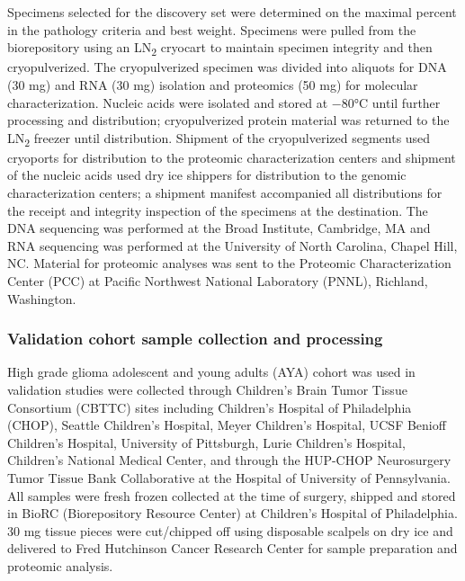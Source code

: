 Specimens selected for the discovery set were determined on the maximal percent in the pathology criteria and best weight. Specimens were pulled from the biorepository using an LN\textsubscript{2} cryocart to maintain specimen integrity and then cryopulverized. The cryopulverized specimen was divided into aliquots for DNA (30 mg) and RNA (30 mg) isolation and proteomics (50 mg) for molecular characterization. Nucleic acids were isolated and stored at −80°C until further processing and distribution; cryopulverized protein material was returned to the LN\textsubscript{2} freezer until distribution. Shipment of the cryopulverized segments used cryoports for distribution to the proteomic characterization centers and shipment of the nucleic acids used dry ice shippers for distribution to the genomic characterization centers; a shipment manifest accompanied all distributions for the receipt and integrity inspection of the specimens at the destination. The DNA sequencing was performed at the Broad Institute, Cambridge, MA and RNA sequencing was performed at the University of North Carolina, Chapel Hill, NC. Material for proteomic analyses was sent to the Proteomic Characterization Center (PCC) at Pacific Northwest National Laboratory (PNNL), Richland, Washington.

\subsubsection{Validation cohort sample collection and processing}
High grade glioma adolescent and young adults (AYA) cohort was used in validation studies were collected through Children’s Brain Tumor Tissue Consortium (CBTTC) sites including Children’s Hospital of Philadelphia (CHOP), Seattle Children's Hospital, Meyer Children's Hospital, UCSF Benioff Children's Hospital, University of Pittsburgh, Lurie Children's Hospital, Children's National Medical Center, and through the HUP-CHOP Neurosurgery Tumor Tissue Bank Collaborative at the Hospital of University of Pennsylvania. All samples were fresh frozen collected at the time of surgery, shipped and stored in BioRC (Biorepository Resource Center) at Children’s Hospital of Philadelphia. 30 mg tissue pieces were cut/chipped off using disposable scalpels on dry ice and delivered to Fred Hutchinson Cancer Research Center for sample preparation and proteomic analysis.

